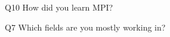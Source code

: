 \begin{description}%
\item{Q10} How did you learn MPI?%
\item{Q7} Which fields are you mostly working in?%
\end{description}%
